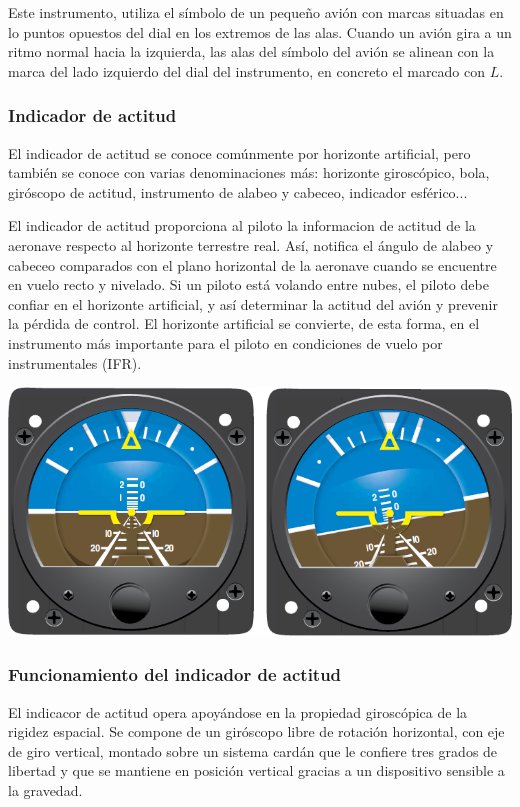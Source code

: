\documentclass{article}
\begin{document}
Este instrumento, utiliza el símbolo de un pequeño avión con marcas situadas en lo puntos opuestos del dial en los extremos de las alas. Cuando un avión gira a un ritmo normal hacia la izquierda, las alas del símbolo del avión se alinean con la marca del lado izquierdo del dial del instrumento, en concreto el marcado con $L$.


\subsubsection{Indicador de actitud}
El indicador de actitud se conoce comúnmente por horizonte artificial, pero también se conoce con varias denominaciones más: horizonte giroscópico, bola, giróscopo de actitud, instrumento de alabeo y cabeceo, indicador esférico...

El indicador de actitud proporciona al piloto la informacion de actitud de la aeronave respecto al horizonte terrestre real. Así, notifica el ángulo de alabeo y cabeceo comparados con el plano horizontal de la aeronave cuando se encuentre en vuelo recto y nivelado. Si un piloto está volando entre nubes, el piloto debe confiar en el horizonte artificial, y así determinar la actitud del avión y prevenir la pérdida de control. El horizonte artificial se convierte, de esta forma, en el instrumento más importante para el piloto en condiciones de vuelo por instrumentales (IFR).

\begin{center}
\includegraphics[scale=1.59]{figuras/horizonte-artificial}
\label{fig:AI}
\end{center}


\subsubsection*{Funcionamiento del indicador de actitud}
El indicacor de actitud opera apoyándose en la propiedad giroscópica de la rigidez espacial. Se compone de un giróscopo libre de rotación horizontal, con eje de giro vertical, montado sobre un sistema cardán que le confiere tres grados de libertad y que se mantiene en posición vertical gracias a un dispositivo sensible a la gravedad.
\end{document}
